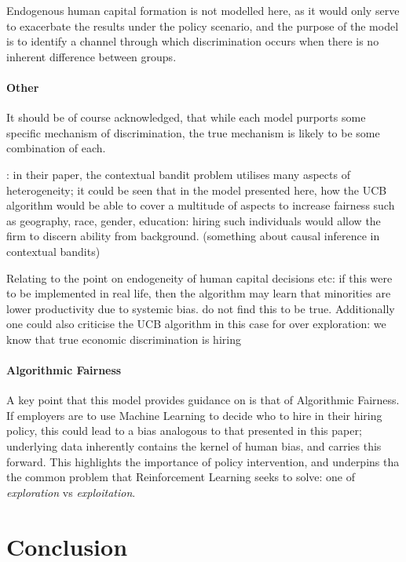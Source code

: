 \documentclass[]{article}
\begin{document}
Endogenous human capital formation is not modelled here, as it would only serve to exacerbate the results under the policy scenario, and the purpose of the model is to identify a channel through which discrimination occurs when there is no inherent difference between groups.
\paragraph*{Other}

It should be of course acknowledged, that while each model purports some specific mechanism of discrimination, the true mechanism is likely to be some combination of each.

\citet{LiRaymondBergman2020}: in their paper, the contextual bandit problem utilises many aspects of heterogeneity; it could be seen that in the model presented here, how the UCB algorithm would be able to cover a multitude of aspects to increase fairness such as geography, race, gender, education: hiring such individuals would allow the firm to discern ability from background. (something about causal inference in contextual bandits)

Relating to the point on endogeneity of human capital decisions etc: if this were to be implemented in real life, then the algorithm may learn that minorities are lower productivity due to systemic bias. \citet{LiRaymondBergman2020} do not find this to be true. Additionally one could also criticise the UCB algorithm in this case for over exploration: we know that true economic discrimination is hiring

\paragraph*{Algorithmic Fairness}

A key point that this model provides guidance on is that of Algorithmic Fairness. If employers are to use Machine Learning to decide who to hire in their hiring policy, this could lead to a bias analogous to that presented in this paper; underlying data inherently contains the kernel of human bias, and carries this forward. This highlights the importance of policy intervention, and underpins tha the common problem that Reinforcement Learning seeks to solve: one of \textit{exploration} vs \textit{exploitation}.


\newpage
\section{Conclusion}
\end{document}
